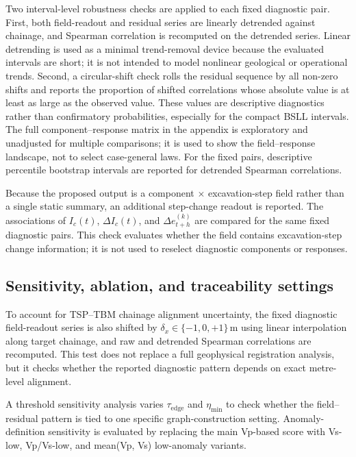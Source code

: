 Two interval-level robustness checks are applied to each fixed diagnostic pair.
First, both field-readout and residual series are linearly detrended against
chainage, and Spearman correlation is recomputed on the detrended series.
Linear detrending is used as a minimal trend-removal device because the
evaluated intervals are short; it is not intended to model nonlinear geological
or operational trends. Second, a circular-shift check rolls the residual
sequence by all non-zero shifts and reports the proportion of shifted
correlations whose absolute value is at least as large as the observed value.
These values are descriptive diagnostics rather than confirmatory
probabilities, especially for the compact BSLL intervals. The full
component--response matrix in the appendix is exploratory and unadjusted for
multiple comparisons; it is used to
show the field--response landscape, not to select case-general
laws. For the fixed pairs, descriptive percentile bootstrap intervals are
reported for detrended Spearman correlations.

Because the proposed output is a component $\times$ excavation-step field
rather than a single static summary, an additional step-change readout is
reported. The associations of $I_c(t)$, $\Delta I_c(t)$, and
$\Delta e_{t+h}^{(k)}$ are compared for the same fixed diagnostic pairs. This
check evaluates whether the field contains excavation-step change information;
it is not used to reselect diagnostic components or responses.

\subsection{Sensitivity, ablation, and traceability settings}
\label{sec:sensitivity_settings}

To account for TSP--TBM chainage alignment uncertainty, the fixed
diagnostic field-readout series is also shifted by $\delta_x\in\{-1,0,+1\}$\,m
using linear interpolation along target chainage, and raw and detrended
Spearman correlations are recomputed. This test does not replace a full
geophysical registration analysis, but it checks whether the reported
diagnostic pattern depends on exact metre-level alignment.

A threshold sensitivity analysis varies $\tau_{\mathrm{edge}}$ and
$\eta_{\min}$ to check whether the field--residual pattern is tied to one
specific graph-construction setting. Anomaly-definition sensitivity is
evaluated by replacing the main Vp-based score with Vs-low, Vp/Vs-low, and
mean(Vp, Vs) low-anomaly variants.

